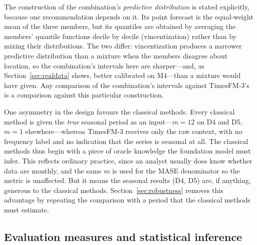 \documentclass[11pt]{article}
\providecommand{\sectionref}[1]{Section~\ref{#1}}
\begin{document}
The construction of the combination's \emph{predictive distribution} is stated explicitly,
because one recommendation depends on it. Its point forecast is the equal-weight mean of the three members, but
its quantiles are obtained by averaging the members' quantile functions decile by decile
(vincentization) rather than by mixing their distributions. The two differ: vincentization
produces a narrower predictive distribution than a mixture when the members disagree about
location, so the combination's intervals here are sharper---and, as \sectionref{sec:realdata}
shows, better calibrated on M4---than a mixture would have given. Any comparison of the
combination's intervals against TimesFM-3's is a comparison against this particular construction.

One asymmetry in the design favours the classical methods.
Every classical method is given the \emph{true} seasonal period as an input---$m = 12$ on D4 and
D5, $m = 1$ elsewhere---whereas TimesFM-3 receives only the raw context, with no frequency label
and no indication that the series is seasonal at all. The classical methods thus begin with a
piece of oracle knowledge the foundation model must infer. This reflects ordinary practice, since
an analyst usually does know whether data are monthly, and the same $m$ is used for the MASE
denominator so the metric is unaffected. But it means the seasonal results (D4, D5) are, if
anything, generous to the classical methods. \sectionref{sec:robustness} removes this advantage
by repeating the comparison with a period that the classical methods must estimate.

\subsection{Evaluation measures and statistical inference}
\label{sec:evaluation}
\end{document}
